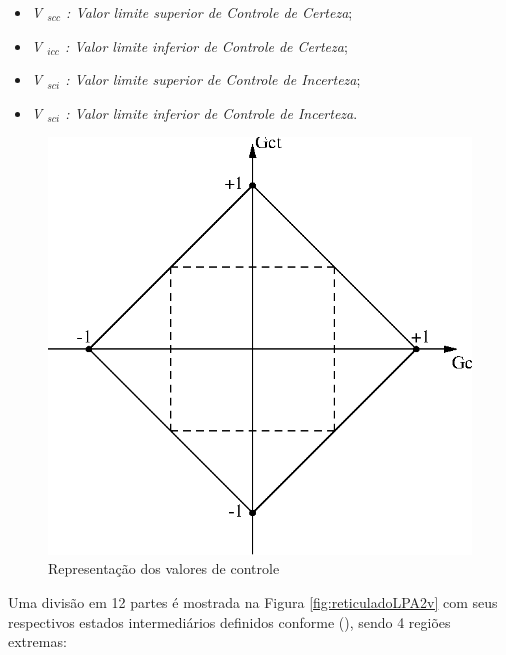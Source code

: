 \begin{itemize}
\item \emph{V $_{scc}$ : Valor limite superior de Controle de Certeza};
\item \emph{V $_{icc}$ : Valor limite inferior de Controle de Certeza};
\item \emph{V $_{sci}$ : Valor limite superior de Controle de Incerteza};
\item \emph{V $_{sci}$ : Valor limite inferior de Controle de Incerteza}.

\end{itemize}

\begin{figure}[!htb]
\center\includegraphics[scale=1.0]{./pic/C429valorControle.eps}
\caption{Representação dos valores de controle}
\label{fig:valorControle}
\end{figure}

Uma divisão em 12 partes é mostrada na Figura \ref{fig:reticuladoLPA2v} com seus respectivos estados intermediários definidos conforme \citeauthor{JoaoInacio}(\citeyear{JoaoInacio}), sendo 4 regiões extremas:





